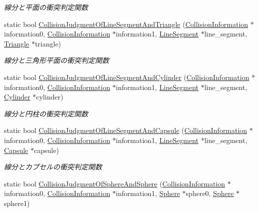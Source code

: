 \begin{DoxyCompactItemize}
\begin{DoxyCompactList}\small\item\em 線分と平面の衝突判定関数 \end{DoxyCompactList}\item 
static bool \mbox{\hyperlink{class_collision_calculation_abb928d90148c02568ee42fc40b90252f}{Collision\+Judgment\+Of\+Line\+Segment\+And\+Triangle}} (\mbox{\hyperlink{class_collision_information}{Collision\+Information}} $\ast$information0, \mbox{\hyperlink{class_collision_information}{Collision\+Information}} $\ast$information1, \mbox{\hyperlink{class_line_segment}{Line\+Segment}} $\ast$line\+\_\+segment, \mbox{\hyperlink{class_triangle}{Triangle}} $\ast$triangle)
\begin{DoxyCompactList}\small\item\em 線分と三角形平面の衝突判定関数 \end{DoxyCompactList}\item 
static bool \mbox{\hyperlink{class_collision_calculation_acf259efc3e9832d34ce16d228fe68dc6}{Collision\+Judgment\+Of\+Line\+Segment\+And\+Cylinder}} (\mbox{\hyperlink{class_collision_information}{Collision\+Information}} $\ast$information0, \mbox{\hyperlink{class_collision_information}{Collision\+Information}} $\ast$information1, \mbox{\hyperlink{class_line_segment}{Line\+Segment}} $\ast$line\+\_\+segment, \mbox{\hyperlink{class_cylinder}{Cylinder}} $\ast$cylinder)
\begin{DoxyCompactList}\small\item\em 線分と円柱の衝突判定関数 \end{DoxyCompactList}\item 
static bool \mbox{\hyperlink{class_collision_calculation_a056df083787054cc7aa33e33540a1e8c}{Collision\+Judgment\+Of\+Line\+Segment\+And\+Capsule}} (\mbox{\hyperlink{class_collision_information}{Collision\+Information}} $\ast$information0, \mbox{\hyperlink{class_collision_information}{Collision\+Information}} $\ast$information1, \mbox{\hyperlink{class_line_segment}{Line\+Segment}} $\ast$line\+\_\+segment, \mbox{\hyperlink{class_capsule}{Capsule}} $\ast$capsule)
\begin{DoxyCompactList}\small\item\em 線分とカプセルの衝突判定関数 \end{DoxyCompactList}\item 
static bool \mbox{\hyperlink{class_collision_calculation_a44fa42f91df139f676f2f8fcb7f1f1cf}{Collision\+Judgment\+Of\+Sphere\+And\+Sphere}} (\mbox{\hyperlink{class_collision_information}{Collision\+Information}} $\ast$information0, \mbox{\hyperlink{class_collision_information}{Collision\+Information}} $\ast$information1, \mbox{\hyperlink{class_sphere}{Sphere}} $\ast$sphere0, \mbox{\hyperlink{class_sphere}{Sphere}} $\ast$sphere1)

\end{DoxyCompactItemize}
